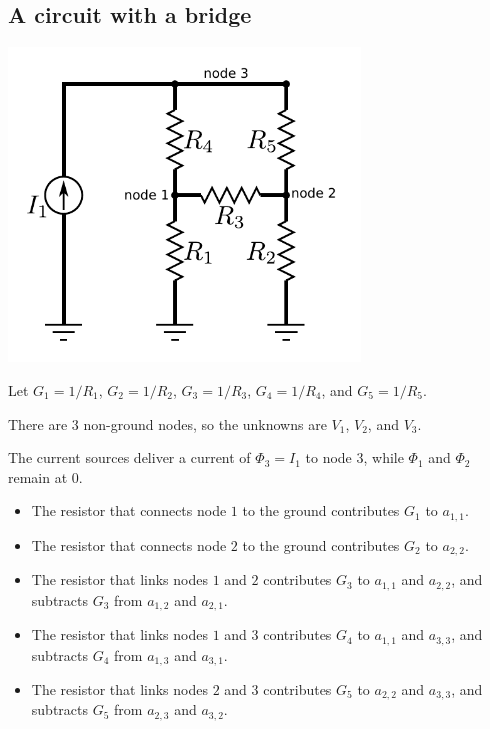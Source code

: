 \documentclass{article}
\begin{document}
\subsection{A circuit with a bridge}

\parbox{0.7\textwidth}{
\includegraphics[width = 0.7\textwidth]{complex_circuit_2}
}

Let \(G_1 = 1/R_1\), \(G_2 = 1/R_2\), \(G_3 = 1/R_3\), \(G_4 = 1/R_4\), and \(G_5 = 1/R_5\).            

There are \(3\) non-ground nodes, so the unknowns are \(V_1\), \(V_2\), and \(V_3\). 

The current sources deliver a current of \(\Phi_3 = I_1\) to node \(3\), while \(\Phi_1\) and \(\Phi_2\) remain at \(0\).

\begin{itemize}
\item The resistor that connects node \(1\) to the ground contributes \(G_1\) to \(a_{1,1}\). 
\item The resistor that connects node \(2\) to the ground contributes \(G_2\) to \(a_{2,2}\). 
\item The resistor that links nodes \(1\) and \(2\) contributes \(G_3\) to \(a_{1,1}\) and \(a_{2,2}\), and subtracts \(G_3\) from \(a_{1,2}\) and \(a_{2,1}\). 
\item The resistor that links nodes \(1\) and \(3\) contributes \(G_4\) to \(a_{1,1}\) and \(a_{3,3}\), and subtracts \(G_4\) from \(a_{1,3}\) and \(a_{3,1}\). 
\item The resistor that links nodes \(2\) and \(3\) contributes \(G_5\) to \(a_{2,2}\) and \(a_{3,3}\), and subtracts \(G_5\) from \(a_{2,3}\) and \(a_{3,2}\).    
\end{itemize}
\end{document}
